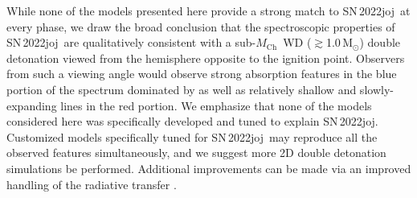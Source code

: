 \documentclass[twocolumn]{aastex631}
\newcommand{\sn}{SN\,2022joj}
\newcommand{\Mch}{$M_\mathrm{Ch}$}
\begin{document}
\begin{CJK*}{UTF8}{gbsn}

While none of the models presented here provide a strong match to \sn\ at every phase, we draw the broad conclusion that the spectroscopic properties of \sn\ are qualitatively consistent with a sub-\Mch\ WD ($\gtrsim$1.0\,$\mathrm{M_\odot}$) double detonation viewed from the hemisphere opposite to the ignition point. Observers from such a viewing angle would observe strong absorption features in the blue portion of the spectrum dominated by  as well as relatively shallow and slowly-expanding  lines in the red portion. We emphasize that none of the models considered here was specifically developed and tuned to explain \sn. Customized models specifically tuned for \sn\ may reproduce all the observed features simultaneously, and we suggest more 2D double detonation simulations be performed. Additional improvements can be made via an improved handling of the radiative transfer \citep[e.g., non-LTE effects; see][]{Shen_NLTE_2021}.


\end{CJK*}
\end{document}
